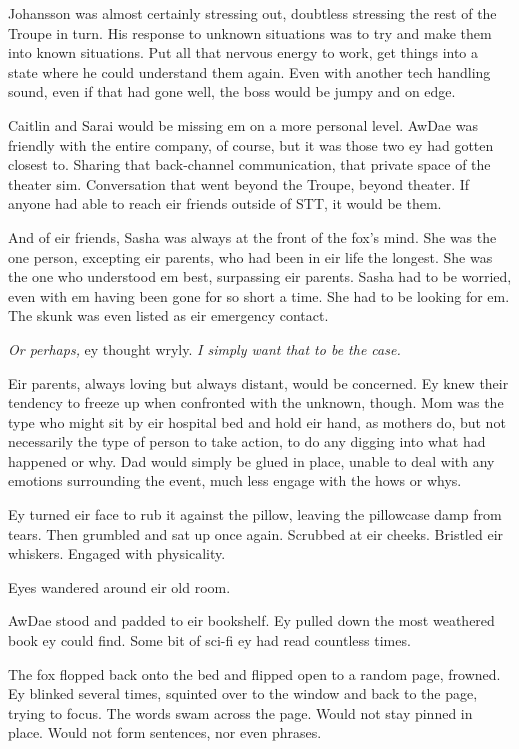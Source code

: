 Johansson was almost certainly stressing out, doubtless stressing the rest of the Troupe in turn. His response to unknown situations was to try and make them into known situations. Put all that nervous energy to work, get things into a state where he could understand them again. Even with another tech handling sound, even if that had gone well, the boss would be jumpy and on edge.

Caitlin and Sarai would be missing em on a more personal level. AwDae was friendly with the entire company, of course, but it was those two ey had gotten closest to. Sharing that back-channel communication, that private space of the theater sim. Conversation that went beyond the Troupe, beyond theater. If anyone had able to reach eir friends outside of STT, it would be them.

And of eir friends, Sasha was always at the front of the fox's mind. She was the one person, excepting eir parents, who had been in eir life the longest. She was the one who understood em best, surpassing eir parents. Sasha had to be worried, even with em having been gone for so short a time. She had to be looking for em. The skunk was even listed as eir emergency contact.

\emph{Or perhaps,} ey thought wryly. \emph{I simply want that to be the case.}

Eir parents, always loving but always distant, would be concerned. Ey knew their tendency to freeze up when confronted with the unknown, though. Mom was the type who might sit by eir hospital bed and hold eir hand, as mothers do, but not necessarily the type of person to take action, to do any digging into what had happened or why. Dad would simply be glued in place, unable to deal with any emotions surrounding the event, much less engage with the hows or whys.

Ey turned eir face to rub it against the pillow, leaving the pillowcase damp from tears. Then grumbled and sat up once again. Scrubbed at eir cheeks. Bristled eir whiskers. Engaged with physicality.

Eyes wandered around eir old room.

AwDae stood and padded to eir bookshelf. Ey pulled down the most weathered book ey could find. Some bit of sci-fi ey had read countless times.

The fox flopped back onto the bed and flipped open to a random page, frowned. Ey blinked several times, squinted over to the window and back to the page, trying to focus. The words swam across the page. Would not stay pinned in place. Would not form sentences, nor even phrases.


